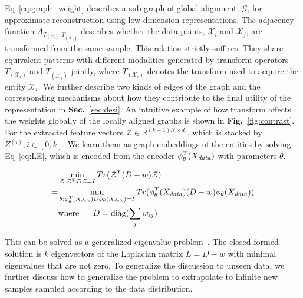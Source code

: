 \documentclass{article}
\begin{document}
Eq~\ref{eq:graph_weight} describes a sub-graph of global alignment,  $\mathcal{G}$, for approximate reconstruction using low-dimension representations. The adjacency function $A_{T_{(\mathcal{X}_i)}, T_{(\mathcal{X}_j)}}$ describes whether the data points, $\mathcal{X}_i$ and $ \mathcal{X}_j$, are transformed from the same sample. This relation strictly suffices. They share equivalent patterns with different modalities generated by transform operators $T_{(\mathcal{X}_i)}$ and $T_{(\mathcal{X}_j)}$ jointly, where $T_{(\mathcal{X}_i)}$ denotes the transform used to acquire the entity $\mathcal{X}_i$. We further describe two kinds of edges of the graph and the corresponding mechanisms about how they contribute to the final utility of the representation in \textbf{Sec.}~\ref{sec:desi}. An intuitive example of how transform affects the weights globally of the locally aligned graphs is shown in \textbf{Fig.}~\ref{fig:contrast}. For the extracted feature vectors $\mathcal{Z} \in \mathbb{R}^{(k+1)N \times d_z}$, which is stacked by $Z^{(i)}, i\in [0, k]$. We learn them as graph embeddings of the entities by solving Eq~\ref{eq:LE}, which is encoded from the encoder $\phi_\theta^T(X_{\text{\textit{data}}})$ with parameters $\theta$. 

\begin{equation}\label{eq:LE}
\begin{aligned}
   & \min_{\mathcal{Z}: \mathcal{Z}^TD\mathcal{Z}=I} Tr(\mathcal{Z}^T(D- w)\mathcal{Z}) \\
   = & \min_{\mathcal{\theta}: \phi_\theta^T(X_{\text{\textit{data}}})D\phi_\theta(X_{\text{\textit{data}}})=I} Tr(\phi_\theta^T(X_{\text{\textit{data}}})(D- w)\phi_\theta(X_{\text{\textit{data}}})) \\
   & \text{where} \ \ \ \ \  D = \text{diag}(\sum_j w_{ij})
\end{aligned}
\end{equation}

This can be solved as a generalized eigenvalue problem~\cite{belkin2003laplacian}. The closed-formed solution is $k$ eigenvectors of the Laplacian matrix $L = D -w$ with minimal eigenvalues that are not zero. To generalize the discussion to unseen data, we further discuss how to generalize the problem to extrapolate to infinite new samples sampled according to the data distribution.
\end{document}
